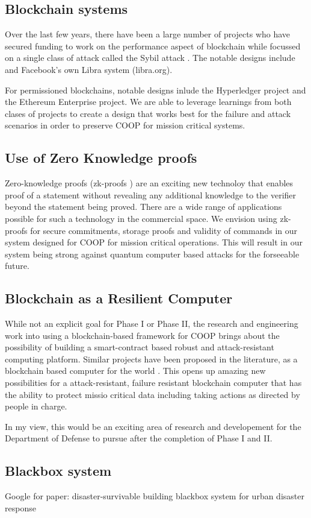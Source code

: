 \subsection{Blockchain systems}
Over the last few years, there have been a large number of projects who have secured funding
to work on the performance aspect of blockchain while focussed on a single class of attack
called the Sybil attack \cite{john2002}. The notable designs include \cite{rapidchain, chainspace, ava2018, thundertoken} and Facebook's own Libra system (libra.org).

For permissioned blockchains, notable designs inlude the Hyperledger project and the Ethereum Enterprise project. We are
able to leverage learnings from both clases of projects to create a design that works best for the failure and
attack scenarios in order to preserve COOP for mission critical systems.

\subsection{Use of Zero Knowledge proofs}

Zero-knowledge proofs (zk-proofs \cite{bunz2018}) are an exciting new technoloy that enables proof of a statement without revealing any additional
knowledge to the verifier beyond the statement being proved. There are a wide range of applications possible for such
a technology in the commercial space. We envision using zk-proofs for secure commitments, storage proofs and validity of
commands in our system designed for COOP for mission critical operations. This will result in our system being strong
against quantum computer based attacks for the forseeable future.

\subsection{Blockchain as a Resilient Computer}

While not an explicit goal for Phase I or Phase II, the research and engineering work into using a blockchain-based
framework for COOP brings about the possibility of building a smart-contract based robust and attack-resistant computing
platform. Similar projects have been proposed in the literature, as a blockchain based computer for the world
\cite{reyes2018, yahya2019, hanke2018}. This opens up amazing new possibilities for a attack-resistant, failure
resistant blockchain computer that has the ability to protect missio critical data including taking actions as directed
by people in charge.

In my view, this would be an exciting area of research and developement for the Department of Defense to pursue after the completion
of Phase I and II.

\subsection{Blackbox system}
Google for paper:
disaster-survivable building blackbox system for urban disaster response

